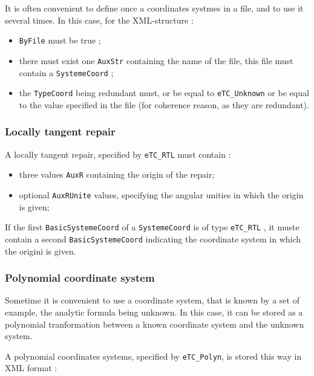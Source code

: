 It is often convenient to define once a coordinates systmes in a file, and
to use it several times. In  this  case, for the XML-structure :


\begin{itemize}
   \item {\tt ByFile} must be true ;
   \item there must exist one {\tt AuxStr} containing the name of the file, this file
         must contain a {\tt SystemeCoord} ;
   \item the  {\tt TypeCoord} being redundant must, or be equal to {\tt eTC\_Unknown} or
         be equal to the value specified in the file (for coherence reason, as they are
         redundant).
\end{itemize}


\subsubsection{Locally tangent repair}

A locally tangent repair, specified by {\tt eTC\_RTL} must contain :

\begin{itemize}
   \item three values {\tt AuxR} containing the origin of the repair;
   \item optional {\tt AuxRUnite} values, specifying the angular unities in  which
         the origin is given;
\end{itemize}

If the first {\tt BasicSystemeCoord} of a {\tt SystemeCoord} is of type {\tt eTC\_RTL} ,
it muste contain a second {\tt BasicSystemeCoord} indicating the coordinate system
in which the origini is given.


\subsubsection{Polynomial coordinate system}

Sometime it is convenient to use a coordinate system, that is known by a set
of example, the analytic formula being unknown.  In this case, it can be stored
as a polynomial tranformation between a known coordinate system and the unknown
system.

A polynomial coordinates systems, specified by {\tt eTC\_Polyn},
 is stored this way in XML format :

